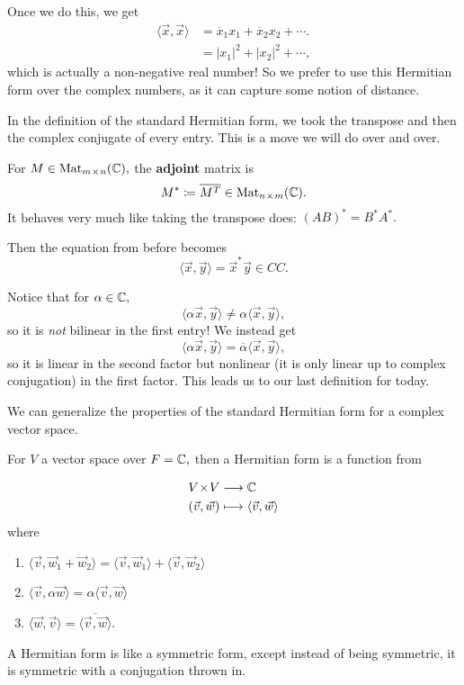 Once we do this, we get 
\begin{align*}
    \langle \vec{x}, \vec{x} \rangle &= \overline{x}_1x_1 + \overline{x}_2x_2 + \cdots. \\
    &= |x_1|^2 + |x_2|^2 + \cdots,
\end{align*}
which is actually a non-negative real number! So we prefer to use this Hermitian form over the complex numbers, as it can capture some notion of distance.

In the definition of the standard Hermitian form, we took the transpose and then the complex conjugate of every entry. This is a move we will do over and over. 

\begin{definition}
For $M \in \text{Mat}_{m \hspace{0.05em}{\times}\hspace{0.05em} n}(\mathbb C),$ the \textbf{adjoint} matrix is 
\[
M^* \coloneqq \overline{M^T} \in \text{Mat}_{n \hspace{0.05em}{\times}\hspace{0.05em} m}(\mathbb C).
\]
It behaves very much like taking the transpose does: $(AB)^* = B^*A^*.$
\end{definition}

Then the equation from before becomes
\[
\langle \vec{x}, \vec{y} \rangle = \vec{x}^*\vec{y} \in CC.
\]

Notice that for $\alpha \in \mathbb C,$
\[
\langle \alpha \vec{x}, \vec{y} \rangle \neq \alpha\langle \vec{x}, \vec{y} \rangle,
\]
so it is \emph{not} bilinear in the first entry! We instead get 
\[
\langle \alpha \vec{x}, \vec{y} \rangle = \overline{\alpha}\langle \vec{x}, \vec{y} \rangle,
\]
so it is linear in the second factor but nonlinear (it is only linear up to complex conjugation) in the first factor. This leads us to our last definition for today. 

We can generalize the properties of the standard Hermitian form for a complex vector space. 

\begin{definition}
For $V$ a vector space over $F = \mathbb C,$ then a Hermitian form is a function from 

\begin{align*}
    V \hspace{0.05em}{\times}\hspace{0.05em} V &\longrightarrow \mathbb C \\
    (\vec{v}, \vec{w}) &\longmapsto \langle \vec{v}, \vec{w} \rangle
\end{align*}
where 
\begin{enumerate}
    \item $\langle \vec{v}, \vec{w}_1 + \vec{w}_2 \rangle = \langle \vec{v}, \vec{w}_1 \rangle + \langle \vec{v}, \vec{w}_2 \rangle$ 
    
    \item $\langle \vec{v}, \alpha\vec{w} \rangle = \alpha \langle \vec{v}, \vec{w} \rangle$
    
    \item $\langle \vec{w}, \vec{v} \rangle = \overline{\langle \vec{v}, \vec{w} \rangle}$. 
\end{enumerate}
A Hermitian form is like a symmetric form, except instead of being symmetric, it is symmetric with a conjugation thrown in.
\end{definition}

